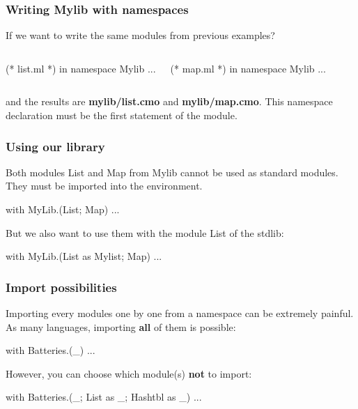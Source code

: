 \documentclass{beamer}
\begin{document}
\begin{frame}[fragile]
\frametitle{Writing Mylib with namespaces}

If we want to write the same modules from previous examples?

\pause

\begin{columns}%
    \begin{OCaml}
      (* list.ml *)
      in namespace Mylib
      ...
    \end{OCaml}

    \begin{OCaml}
      (* map.ml *)
      in namespace Mylib
      ...
    \end{OCaml}
\end{columns}

and the results are \textbf{mylib/list.cmo} and \textbf{mylib/map.cmo}.
This namespace declaration must be the first statement of the module.
\end{frame}

\begin{frame}[fragile]
\frametitle{Using our library}

Both modules List and Map from Mylib cannot be used as standard modules. They
must be imported into the environment.

\pause

\begin{OCaml}
with MyLib.(List; Map)
...
\end{OCaml}

\pause

But we also want to use them with the module List of the stdlib:

\begin{OCaml}
with MyLib.(List as Mylist; Map)
...
\end{OCaml}

\end{frame}

\begin{frame}[fragile]
\frametitle{Import possibilities}

Importing every modules one by one from a namespace can be extremely painful. As
many languages, importing \textbf{all} of them is possible:

\begin{OCaml}
with Batteries.(_)
...
\end{OCaml}

\pause

However, you can choose which module(s) \textbf{not} to import:
\begin{OCaml}
with Batteries.(_; List as _; Hashtbl as _)
...
\end{OCaml}

\end{frame}
\end{document}
